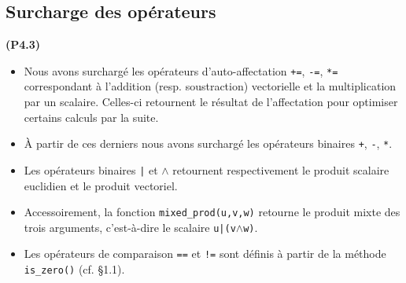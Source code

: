 \documentclass[12pt, letterpaper, twoside]{article}
\newcommand{\T}[1]{\texttt{#1}}
\begin{document}
\subsection{Surcharge des opérateurs}
\noindent \textbf{(P4.3)}
\begin{itemize}
\item Nous avons surchargé les opérateurs d'auto-affectation \T{+=}, \T{-=}, \T{*=} correspondant à l'addition (resp. soustraction) vectorielle et la multiplication par un scalaire. Celles-ci retournent le résultat de l'affectation pour optimiser certains calculs par la suite.

\item À partir de ces derniers nous avons surchargé les opérateurs binaires \T{+}, \T{-}, \T{*}.

\item Les opérateurs binaires \T{|} et \T{$\wedge$} retournent respectivement le produit scalaire euclidien et le produit vectoriel.

\item Accessoirement, la fonction \T{mixed\_prod(u,v,w)} retourne le produit mixte des trois arguments, c'est-à-dire le scalaire \T{u|(v$\wedge$w)}.

\item Les opérateurs de comparaison \T{==} et \T{!=} sont définis à partir de la méthode \T{is\_zero()} (cf. \S1.1).
\end{itemize}
\end{document}
